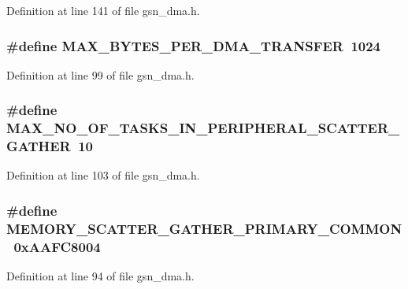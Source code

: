 Definition at line 141 of file gsn\_\-dma.h.

\hypertarget{a00484_a9cdc76d0ead7d68830bee5508ff4a099}{
\subsubsection[{MAX\_\-BYTES\_\-PER\_\-DMA\_\-TRANSFER}]{\setlength{\rightskip}{0pt plus 5cm}\#define MAX\_\-BYTES\_\-PER\_\-DMA\_\-TRANSFER~1024}}
\label{a00484_a9cdc76d0ead7d68830bee5508ff4a099}


Definition at line 99 of file gsn\_\-dma.h.

\hypertarget{a00484_acb8951c4fdb17d6f194ec2a38cd53199}{
\subsubsection[{MAX\_\-NO\_\-OF\_\-TASKS\_\-IN\_\-PERIPHERAL\_\-SCATTER\_\-GATHER}]{\setlength{\rightskip}{0pt plus 5cm}\#define MAX\_\-NO\_\-OF\_\-TASKS\_\-IN\_\-PERIPHERAL\_\-SCATTER\_\-GATHER~10}}
\label{a00484_acb8951c4fdb17d6f194ec2a38cd53199}


Definition at line 103 of file gsn\_\-dma.h.

\hypertarget{a00484_acbb264dcf72e5f414bd8ce4b5e993744}{
\subsubsection[{MEMORY\_\-SCATTER\_\-GATHER\_\-PRIMARY\_\-COMMON}]{\setlength{\rightskip}{0pt plus 5cm}\#define MEMORY\_\-SCATTER\_\-GATHER\_\-PRIMARY\_\-COMMON~0xAAFC8004}}
\label{a00484_acbb264dcf72e5f414bd8ce4b5e993744}


Definition at line 94 of file gsn\_\-dma.h.

